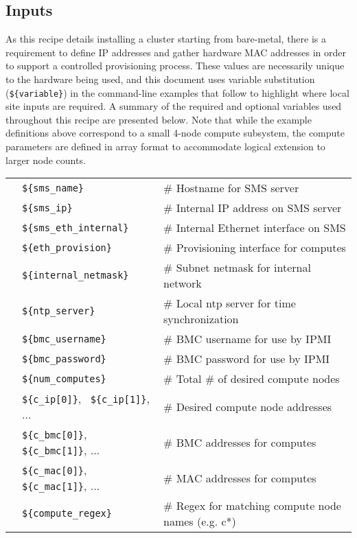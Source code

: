 
\subsection{Inputs} \label{sec:inputs}
As this recipe details installing a cluster starting from bare-metal, there is a requirement to define IP addresses and
gather hardware MAC addresses in order to support a controlled provisioning process. These values are necessarily unique
to the hardware being used, and this document uses variable substitution (\texttt{\$\{variable\}}) in the command-line
examples that follow to highlight where local site inputs are required. A summary of the required and optional variables
used throughout this recipe are presented below. Note that while the example definitions above correspond to a small
4-node compute subsystem, the compute parameters are defined in array format to accommodate logical extension to larger
node counts. \\

\vspace*{0.2cm}
\begin{tabular}{@{}>{\textbullet}l p{7cm} l}
& \texttt{\$\{sms\_name\}} & {\small \# Hostname for SMS server} \\
& \texttt{\$\{sms\_ip\}} & {\small \# Internal IP address on SMS server}  \\
& \texttt{\$\{sms\_eth\_internal\}} & {\small \# Internal Ethernet interface on SMS} \\
& \texttt{\$\{eth\_provision\}} & {\small \# Provisioning interface for computes} \\
& \texttt{\$\{internal\_netmask\}} & {\small \# Subnet netmask for internal network} \\
& \texttt{\$\{ntp\_server\}} & {\small \# Local ntp server for time synchronization} \\
& \texttt{\$\{bmc\_username\}} & {\small \# BMC username for use by IPMI} \\
& \texttt{\$\{bmc\_password\}} & {\small \# BMC password for use by IPMI} \\
& \texttt{\$\{num\_computes\}} & {\small \# Total \# of desired compute nodes} \\
& \texttt{\$\{c\_ip[0]\}}, \, \texttt{\$\{c\_ip[1]\}}, ... & {\small \# Desired compute node addresses} \\
& \texttt{\$\{c\_bmc[0]\}}, \texttt{\$\{c\_bmc[1]\}}, ... & {\small \# BMC addresses for computes} \\
& \texttt{\$\{c\_mac[0]\}}, \texttt{\$\{c\_mac[1]\}}, ... & {\small \# MAC addresses for computes} \\
& \texttt{\$\{compute\_regex\}} & {\small \# Regex for matching compute node names (e.g. c*)} \\
\end{tabular}

